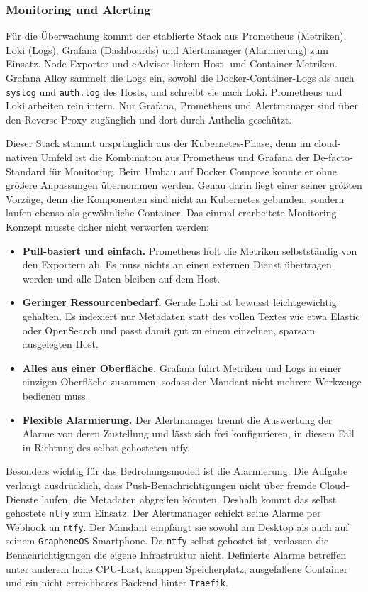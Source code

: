 \subsubsection{Monitoring und Alerting} \label{sec:apphost-monitoring}

Für die Überwachung kommt der etablierte Stack aus Prometheus (Metriken),
Loki (Logs), Grafana (Dashboards) und Alertmanager (Alarmierung) zum Einsatz.
Node-Exporter und cAdvisor liefern Host- und Container-Metriken. Grafana
Alloy sammelt die Logs ein, sowohl die Docker-Container-Logs als auch
\texttt{syslog} und \texttt{auth.log} des Hosts, und schreibt sie nach Loki.
Prometheus und Loki arbeiten rein intern. Nur Grafana, Prometheus und
Alertmanager sind über den Reverse Proxy zugänglich und dort durch Authelia
geschützt.

Dieser Stack stammt ursprünglich aus der Kubernetes-Phase, denn im
cloud-nativen Umfeld ist die Kombination aus Prometheus und Grafana der
De-facto-Standard für Monitoring. Beim Umbau auf Docker Compose konnte er
ohne größere Anpassungen übernommen werden. Genau darin liegt einer seiner
größten Vorzüge, denn die Komponenten sind nicht an Kubernetes gebunden,
sondern laufen ebenso als gewöhnliche Container. Das einmal erarbeitete
Monitoring-Konzept musste daher nicht verworfen werden:

\begin{itemize}
  \item \textbf{Pull-basiert und einfach.} Prometheus holt die Metriken
    selbstständig von den Exportern ab. Es muss nichts an einen externen
    Dienst übertragen werden und alle Daten bleiben auf dem Host.
  \item \textbf{Geringer Ressourcenbedarf.} Gerade Loki ist bewusst
    leichtgewichtig gehalten. Es indexiert nur Metadaten statt des vollen
    Textes wie etwa Elastic oder OpenSearch und passt damit gut zu einem
    einzelnen, sparsam ausgelegten Host.
  \item \textbf{Alles aus einer Oberfläche.} Grafana führt Metriken und Logs
    in einer einzigen Oberfläche zusammen, sodass der Mandant nicht mehrere
    Werkzeuge bedienen muss.
  \item \textbf{Flexible Alarmierung.} Der Alertmanager trennt die Auswertung
    der Alarme von deren Zustellung und lässt sich frei konfigurieren, in
    diesem Fall in Richtung des selbst gehosteten ntfy.
\end{itemize}

Besonders wichtig für das Bedrohungsmodell ist die Alarmierung. Die Aufgabe
verlangt ausdrücklich, dass Push-Benachrichtigungen nicht über fremde
Cloud-Dienste laufen, die Metadaten abgreifen könnten. Deshalb kommt das
selbst gehostete \texttt{ntfy} zum Einsatz. Der Alertmanager schickt seine
Alarme per Webhook an \texttt{ntfy}. Der Mandant empfängt sie sowohl am Desktop als
auch auf seinem \texttt{GrapheneOS}-Smartphone. Da \texttt{ntfy} selbst gehostet ist, verlassen
die Benachrichtigungen die eigene Infrastruktur nicht. Definierte Alarme
betreffen unter anderem hohe \ac{CPU}-Last, knappen Speicherplatz,
ausgefallene Container und ein nicht erreichbares Backend hinter \texttt{Traefik}.

